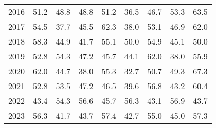 \documentclass{article}
\begin{document}
\begin{table}[!ht]
\begin{tabular}{l | rr| rr | rr| rr}
2016 & 51.2 & 48.8 & 48.8 & 51.2 & \cellcolor{red!25}36.5 & 46.7 & 53.3 & \cellcolor{green!25}63.5 \\
2017 & 54.5 & \cellcolor{red!25}37.7 & 45.5 & \cellcolor{green!25}62.3 & 38.0 & 53.1 & 46.9 & 62.0 \\
2018 & \cellcolor{green!25}58.3 & 44.9 & \cellcolor{red!25}41.7 & 55.1 & 50.0 & 54.9 & 45.1 & 50.0 \\
2019 & 52.8 & 54.3 & 47.2 & 45.7 & 44.1 & \cellcolor{green!25}62.0 & \cellcolor{red!25}38.0 & 55.9 \\
2020 & 62.0 & 44.7 & 38.0 & 55.3 & \cellcolor{red!25}32.7 & 50.7 & 49.3 & \cellcolor{green!25}67.3 \\
2021 & 52.8 & 53.5 & 47.2 & 46.5 & \cellcolor{red!25}39.6 & 56.8 & 43.2 & \cellcolor{green!25}60.4 \\
2022 & 43.4 & 54.3 & 56.6 & 45.7 & 56.3 & \cellcolor{red!25}43.1 & \cellcolor{green!25}56.9 & 43.7 \\
2023 & 56.3 & \cellcolor{red!25}41.7 & 43.7 & \cellcolor{green!25}57.4 & 42.7 & 55.0 & 45.0 & 57.3 \\
\hline
\end{tabular}
\end{table}
\end{document}
